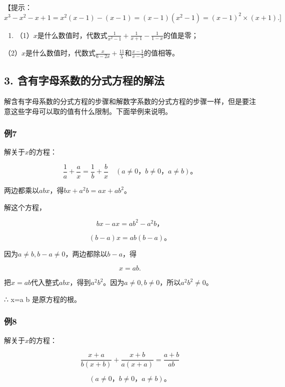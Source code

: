 【提示：\(x^{3} - x^{2} - x + 1 = x^{2}(x - 1) - (x - 1) = (x - 1)(x^{2} - 1) = (x - 1)^{2}\times (x + 1).]\)

\begin{enumerate}[start=12]
\item
  （1）\(x\)是什么数值时，代数式\(\frac{1}{x^2 - 1} + \frac{1}{x + 1} - \frac{1}{1 - x}\)的值是零；
\end{enumerate}

（2）\(x\)是什么数值时，代数式\(\frac{x}{6 - 2x} + \frac{11}{5}\)和\(\frac{x - 1}{x - 3}\)的值相等。

\subsection{3. 含有字母系数的分式方程的解法}

解含有字母系数的分式方程的步骤和解数字系数的分式方程的步骤一样，但是要注意这些字母可以取的值有什么限制。下面举例来说明。

\subsubsection{例7}

解关于\(x\)的方程：

\[
\frac{1}{a} + \frac{a}{x} = \frac{1}{b} + \frac{b}{x} \quad (a \neq 0\text{，} b \neq 0\text{，} a \neq b)\text{。}
\]

 两边都乘以\(abx\)，得\(bx + a^2b = ax + ab^2\)。

解这个方程，

\[
b x - a x = a b ^ {2} - a ^ {2} b\text{，}
\]

\[
(b - a) x = a b (b - a)\text{。}
\]

因为\(a \neq b, b - a \neq 0\)，两边都除以\(b - a\)，得

\[
x = a b.
\]

把\(x = ab\)代入整式\(abx\)，得到\(a^2b^2\)。因为\(a \neq 0, b \neq 0\)，所以\(a^2b^2 \neq 0\)。

∴ x=a b 是原方程的根。

\subsubsection{例8}

解关于\(x\)的方程：

\[
\frac{x + a}{b(x + b)} + \frac{x + b}{a(x + a)} = \frac{a + b}{ab}
\]

\[
(a \neq 0\text{，} b \neq 0\text{，} a \neq b)\text{。}
\]

